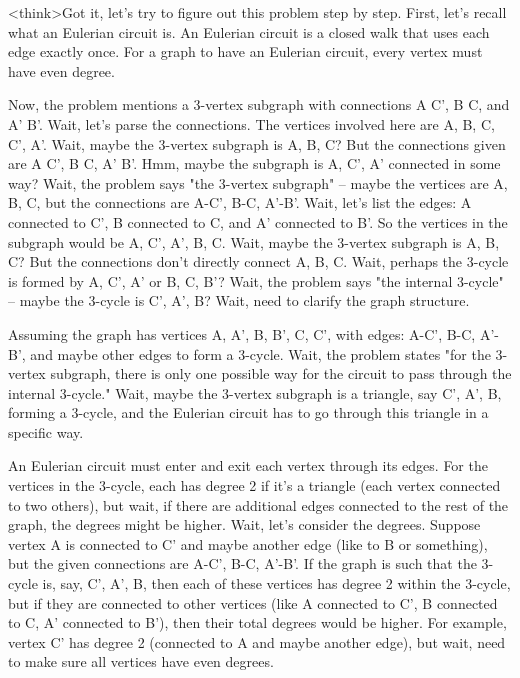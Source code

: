 <think>Got it, let's try to figure out this problem step by step. First, let's recall what an Eulerian circuit is. An Eulerian circuit is a closed walk that uses each edge exactly once. For a graph to have an Eulerian circuit, every vertex must have even degree. 

Now, the problem mentions a 3-vertex subgraph with connections A C', B C, and A' B'. Wait, let's parse the connections. The vertices involved here are A, B, C, C', A'. Wait, maybe the 3-vertex subgraph is A, B, C? But the connections given are A C', B C, A' B'. Hmm, maybe the subgraph is A, C', A' connected in some way? Wait, the problem says "the 3-vertex subgraph" – maybe the vertices are A, B, C, but the connections are A-C', B-C, A'-B'. Wait, let's list the edges: A connected to C', B connected to C, and A' connected to B'. So the vertices in the subgraph would be A, C', A', B, C. Wait, maybe the 3-vertex subgraph is A, B, C? But the connections don't directly connect A, B, C. Wait, perhaps the 3-cycle is formed by A, C', A' or B, C, B'? Wait, the problem says "the internal 3-cycle" – maybe the 3-cycle is C', A', B? Wait, need to clarify the graph structure.

Assuming the graph has vertices A, A', B, B', C, C', with edges: A-C', B-C, A'-B', and maybe other edges to form a 3-cycle. Wait, the problem states "for the 3-vertex subgraph, there is only one possible way for the circuit to pass through the internal 3-cycle." Wait, maybe the 3-vertex subgraph is a triangle, say C', A', B, forming a 3-cycle, and the Eulerian circuit has to go through this triangle in a specific way. 

An Eulerian circuit must enter and exit each vertex through its edges. For the vertices in the 3-cycle, each has degree 2 if it's a triangle (each vertex connected to two others), but wait, if there are additional edges connected to the rest of the graph, the degrees might be higher. Wait, let's consider the degrees. Suppose vertex A is connected to C' and maybe another edge (like to B or something), but the given connections are A-C', B-C, A'-B'. If the graph is such that the 3-cycle is, say, C', A', B, then each of these vertices has degree 2 within the 3-cycle, but if they are connected to other vertices (like A connected to C', B connected to C, A' connected to B'), then their total degrees would be higher. For example, vertex C' has degree 2 (connected to A and maybe another edge), but wait, need to make sure all vertices have even degrees. 

